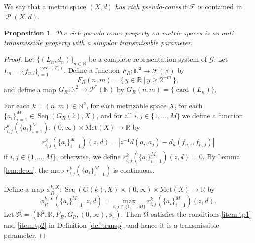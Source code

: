 \documentclass[a4paper, 12pt]{amsart}
\theoremstyle{plain}
\newtheorem{prop}[thm]{Proposition}
\theoremstyle{definition}
\theoremstyle{remark}
\newcommand{\nn}{\mathbb{N}}
\newcommand{\rr}{\mathbb{R}}
\DeclareMathOperator{\card}{card}
\DeclareMathOperator{\pc}{\mathscr{P}}
\DeclareMathOperator{\seq}{Seq}
\newcommand{\met}[1]{\mathrm{Met}(#1)}
\begin{document}
 
We say that a metric space 
$(X, d)$ 
\emph{has rich pseudo-cones} 
if 
$\mathscr{F}$
 is contained in 
 $\pc(X, d)$. 
\begin{prop}
The rich pseudo-cones property on metric spaces  is 
an anti-transmissible  property with a singular transmissible  parameter. 
\end{prop}
\begin{proof}
Let 
$\{(L_{n}, d_{n})\}_{n\in \nn}$ 
be a complete representation system of 
$\mathscr{G}$. 
Let 
$L_{n}=\{f_{n, l}\}_{l=1}^{\card(F_{i})}$. 
Define a function 
$F_{R}\colon  \nn^2\to \mathcal{F}(\rr)$ 
by 
\[
	F_{R}(n, m)=\{\, y\in \rr\mid y\ge 2^{-m}\, \}, 
\]
and define a map 
$G_{R}\colon \nn^{2}\to \mathcal{P}^{*}(\nn)$ 
by 
$G_{R}(n, m)=\{\card(L_{n})\}$. 





For each  
$k=(n, m)\in \nn^{2}$,  
for each metrizable space 
$X$,  
for each 
$\{a_{i}\}_{i=1}^{M}\in \seq(G_{R}(k), X)$,  
and for all 
$i, j\in \{1, \dots, M\}$ 
we define a function 
$r_{i, j}^{k}(\{a_i\}_{i=1}^{M})
\colon  (0, \infty)\times \met{X}\to \rr$ 
by 
\begin{align*}
	r_{i, j}^{k}(\{a_{i}\}_{i=1}^{M})(z, d)
	=
	|z^{-1}d(a_{i}, a_{j})-d_{n}(f_{n, i}, f_{n, j})| 
\end{align*}
if 
$i, j\in \{1, \dots, M\}$; 
otherwise, 
we define 
$r_{i, j}^{k}(\{a_i\}_{i=1}^{M})(z, d)=0$.
By Lemma
 \ref{lem:dcon}, 
 the map 
 $r_{i, j}^k(\{a_i\}_{i=1}^{M})$
  is continuous. 
  
  
  

Define a map 
$\phi_{R}^{k, X}\colon  \seq(G(k), X)\times(0, \infty)\times \met{X}\to \rr$ 
by 
\[
	\phi_R^{k, X}(\{a_{i}\}_{i=1}^{M}, z, d)
	=
	\max_{i, j\in \{1, \dots, M\}}r_{i, j}^{k}(\{a_{i}\}_{i=1}^{M})(z, d). 
\]
Let 
$\mathfrak{R}=(\nn^{2}, \rr, F_{R},  G_{R}, (0, \infty), \phi_r)$. 
Then 
$\mathfrak{R}$ 
satisfies the conditions 
\ref{item:tp1} and 
\ref{item:tp2}
in Definition 
\ref{def:transp}, 
and hence 
it is a transmissible parameter. 




\end{proof}
\end{document}
